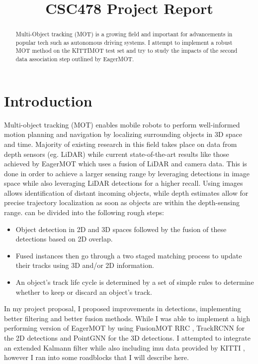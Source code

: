 \documentclass{article}
\title{CSC478 Project Report}
\begin{document}
\maketitle


\begin{abstract}
Multi-Object tracking (MOT) is a growing field and important for advancements in popular tech such as autonomous driving systems. I attempt to implement a robust MOT method \cite{Kim21ICRA} on the KITTIMOT test set \cite{Geiger2012CVPR}
and try to study the impacts of the second data association step outlined by EagerMOT.
\end{abstract}


\section{Introduction}
Multi-object tracking (MOT) enables mobile robots to perform well-informed motion planning and navigation by localizing surrounding objects in 3D space and time. Majority of existing research in this field takes place on data from depth sensors (eg. LiDAR) while current state-of-the-art results like those achieved by EagerMOT \cite{Kim21ICRA} which uses a fusion of LiDAR and camera data. This is done in order to achieve a larger sensing range by leveraging detections in image space while also leveraging LiDAR detections for a higher recall. Using images allows identification of distant incoming objects, while depth estimates allow for precise trajectory localization as soon as objects are within the depth-sensing range. \cite{Kim21ICRA} can be divided into the following rough steps:
\begin{itemize}
    \item Object detection in 2D and 3D spaces followed by the fusion of these detections based on 2D overlap.
    \item Fused instances then go through a two staged matching process to update their tracks using 3D and/or 2D information.
    \item An object’s track life cycle is determined by a set of simple rules to determine whether to keep or discard an object’s track. 
\end{itemize}
 
In my project proposal, I proposed improvements in detections, implementing better filtering and better fusion methods. While I was able to implement a high performing version of EagerMOT by using FusionMOT RRC \cite{luiten2019track}, TrackRCNN  \cite{Voigtlaender19CVPR_MOTS} for the 2D detections and PointGNN \cite{Point-GNN} for the 3D detections. I attempted to integrate an extended Kalmann filter while also including imu data provided by KITTI \cite{Geiger2012CVPR},
however I ran into some roadblocks that I will describe here. 
\end{document}
